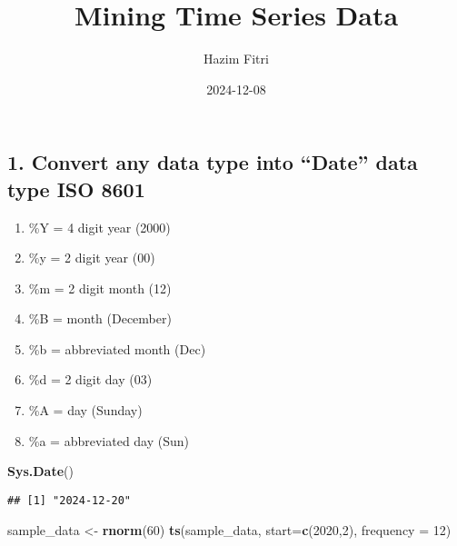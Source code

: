 \documentclass[
]{article}
\title{Mining Time Series Data}
\author{Hazim Fitri}
\date{2024-12-08}
\newenvironment{Shaded}{\begin{snugshade}}{\end{snugshade}}
\newcommand{\AttributeTok}[1]{\textcolor[rgb]{0.13,0.29,0.53}{#1}}
\newcommand{\DecValTok}[1]{\textcolor[rgb]{0.00,0.00,0.81}{#1}}
\newcommand{\FunctionTok}[1]{\textcolor[rgb]{0.13,0.29,0.53}{\textbf{#1}}}
\newcommand{\NormalTok}[1]{#1}
\newcommand{\OtherTok}[1]{\textcolor[rgb]{0.56,0.35,0.01}{#1}}
\providecommand{\tightlist}{%
  \setlength{\itemsep}{0pt}\setlength{\parskip}{0pt}}
\begin{document}
\maketitle

{
\setcounter{tocdepth}{6}
\tableofcontents
}
\subsection{1. Convert any data type into ``Date'' data type ISO
8601}\label{convert-any-data-type-into-date-data-type-iso-8601}

\begin{enumerate}
\def\labelenumi{\arabic{enumi}.}
\tightlist
\item
  \%Y = 4 digit year (2000)
\item
  \%y = 2 digit year (00)
\item
  \%m = 2 digit month (12)
\item
  \%B = month (December)
\item
  \%b = abbreviated month (Dec)
\item
  \%d = 2 digit day (03)
\item
  \%A = day (Sunday)
\item
  \%a = abbreviated day (Sun)
\end{enumerate}

\begin{Shaded}
\begin{Highlighting}[]
\FunctionTok{Sys.Date}\NormalTok{()}
\end{Highlighting}
\end{Shaded}

\begin{verbatim}
## [1] "2024-12-20"
\end{verbatim}

\begin{Shaded}
\begin{Highlighting}[]
\NormalTok{sample\_data }\OtherTok{\textless{}{-}} \FunctionTok{rnorm}\NormalTok{(}\DecValTok{60}\NormalTok{)}
\FunctionTok{ts}\NormalTok{(sample\_data, }\AttributeTok{start=}\FunctionTok{c}\NormalTok{(}\DecValTok{2020}\NormalTok{,}\DecValTok{2}\NormalTok{), }\AttributeTok{frequency =} \DecValTok{12}\NormalTok{)}
\end{Highlighting}
\end{Shaded}
\end{document}
